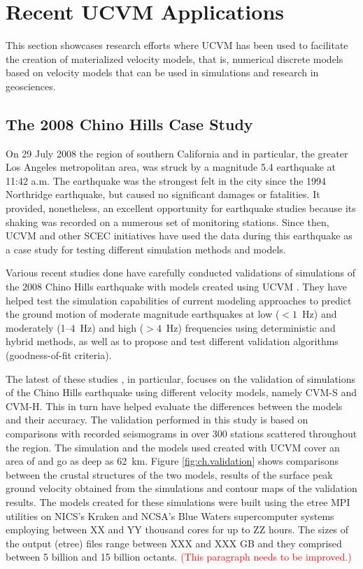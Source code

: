 
\section{Recent UCVM Applications}

This section showcases research efforts where UCVM has been used to facilitate the creation of materialized velocity models, that is, numerical discrete models based on velocity models that can be used in simulations and research in geosciences.

\subsection{The 2008 Chino Hills Case Study}

On 29 July 2008 the region of southern California and in particular, the greater Los Angeles metropolitan area, was struck by a magnitude  5.4 earthquake at 11:42 a.m. The earthquake was the strongest felt in the city since the 1994 Northridge earthquake, but caused no significant damages or fatalities. It provided, nonetheless, an excellent opportunity for earthquake studies because its shaking was recorded on a numerous set of monitoring stations. Since then, UCVM and other SCEC initiatives have used the data during this earthquake as a case study for testing different simulation methods and models. 

Various recent studies done have carefully conducted validations of simulations of the 2008 Chino Hills earthquake with models created using UCVM \citep[e.g.,][]{Olsen_2010_SRL, Taborda_2013_BSSA, Taborda_2014_BSSA}. They have helped test the simulation capabilities of current modeling approaches to predict the ground motion of moderate magnitude earthquakes at low ($<1$~Hz) and moderately (1--4~Hz) and high ($>4$~Hz) frequencies using deterministic and hybrid methods, as well as to propose and test different validation algorithms (goodness-of-fit criteria). 

The latest of these studies \citep{Taborda_2014_BSSA}, in particular, focuses on the validation of simulations of the Chino Hills earthquake using different velocity models, namely CVM-S and CVM-H. This in turn have helped evaluate the differences between the models and their accuracy. The validation performed in this study is based on comparisons with recorded seismograms in over 300 stations scattered throughout the region. The simulation and the models used created with UCVM cover an area of  and go as deep as 62~km. Figure \ref{fig:ch.validation} shows comparisons between the crustal structures of the two models, results of the surface peak ground velocity obtained from the simulations and contour maps of the validation results. The models created for these simulations were built using the etree MPI utilities on NICS's Kraken and NCSA's Blue Waters supercomputer systems employing between XX and YY thousand cores for up to ZZ hours. The sizes of the output (etree) files range between XXX and XXX GB and they comprised between 5 billion and 15 billion octants. \textcolor{red}{(This paragraph needs to be improved.)}

